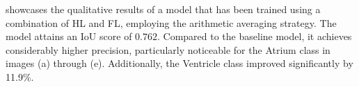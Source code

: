  showcases the qualitative results of a model that has been trained using a combination of \ac{HL} and \ac{FL}, employing the arithmetic averaging strategy. The model attains an \ac{IoU} score of $0.762$. Compared to the baseline model, it achieves considerably higher precision, particularly noticeable for the Atrium class in images (a) through (e). Additionally, the Ventricle class improved significantly by 11.9\%.

\begin{figure}[H]%
  \centering  

\end{figure}
